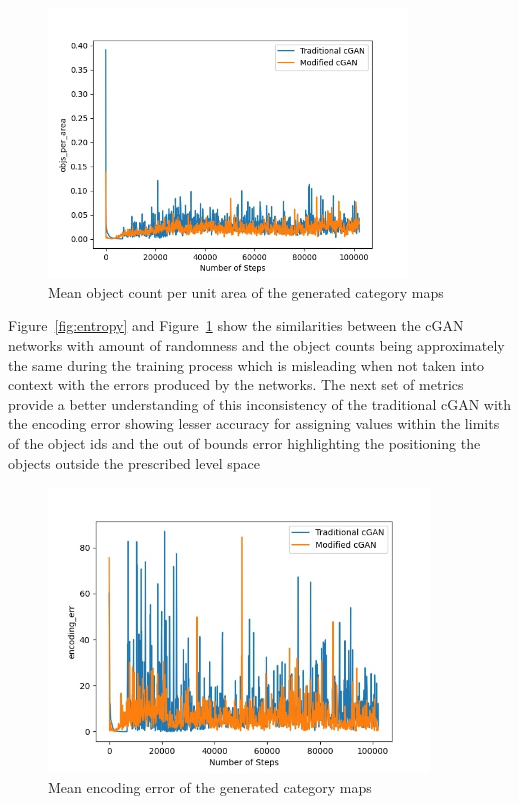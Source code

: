 \documentclass{Configuration_Files/PoliMi3i_thesis}
\begin{document}
\begin{figure}[H]
    \centering
    \includegraphics[width=0.85\textwidth]{obj_count.jpg}
    \caption{Mean object count per unit area of the generated category maps}
    \label{fig:objcount}
\end{figure}
Figure~\ref{fig:entropy} and Figure~\ref{fig:objcount} show the similarities between the cGAN networks with amount of 
randomness and the object counts being approximately the same during the training 
process which is misleading when not taken into context with the errors produced by 
the networks. The next set of metrics provide a better understanding of this 
inconsistency of the traditional cGAN with the encoding error showing lesser 
accuracy for assigning values within the limits of the object ids and the out of bounds 
error highlighting the positioning the objects outside the prescribed level space
\begin{figure}[H]
    \centering
    \includegraphics[width=0.9\textwidth]{enc_err.jpg}
    \caption{Mean encoding error of the generated category maps}
    \label{fig:encerror}
\end{figure}
\end{document}
